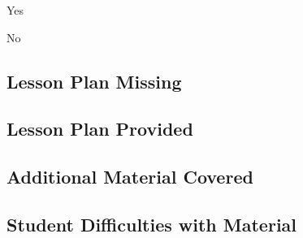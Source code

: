 \documentclass[10pt]{article}
\begin{document}
\begin{todolist}
    \item Yes
    \item No
\end{todolist}

\subsection*{Lesson Plan Missing}

\begin{description}
    \item[Material Presented] \uline{\hfill\null}
    \item \uline{\hfill\null}
    \item \uline{\hfill\null}
\end{description}

\subsection*{Lesson Plan Provided}

\begin{description}
    \item \uline{\hfill\null}
    \item \uline{\hfill\null}
    \item \uline{\hfill\null}
\end{description}

\subsection*{Additional Material Covered}

\begin{description}
    \item \uline{\hfill\null}
    \item \uline{\hfill\null}
    \item \uline{\hfill\null}
\end{description}

\subsection*{Student Difficulties with Material}

\begin{description}
    \item \uline{\hfill\null}
    \item \uline{\hfill\null}
    \item \uline{\hfill\null}
\end{description}
\end{document}
